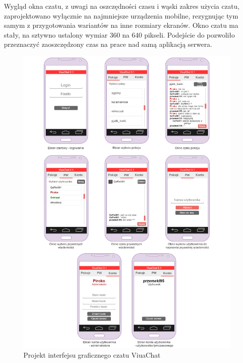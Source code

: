 Wygląd okna czatu, z uwagi na oszczędności czasu i wąski zakres użycia czatu,
zaprojektowano wyłącznie na najmniejsze urządzenia mobilne, rezygnując tym
samym z przygotowania wariantów na inne rozmiary ekranów. Okno czatu ma stały,
na sztywno ustalony wymiar 360 na 640 pikseli. Podejście do pozwoliło
przeznaczyć zaoszczędzony czas na prace nad samą aplikacją serwera.

\begin{figure}[!htp]
	\centering
	\includegraphics[width=\textwidth]{chat/fig/GUI}
	\caption{Projekt interfejsu graficznego czatu ViuaChat}
	\label{GUI}
\end{figure}

